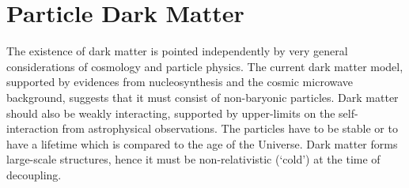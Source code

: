 \chapter{Particle Dark Matter}
\label{chParticleDarkMatter}

The existence of dark matter is pointed independently by very general considerations of cosmology and particle physics. 
The current dark matter model, supported by evidences from nucleosynthesis and the cosmic microwave background, suggests that it must consist of non-baryonic particles. 
Dark matter should also be weakly interacting, supported by upper-limits on the self-interaction from astrophysical observations. 
The particles have to be stable or to have a lifetime which is compared to the age of the Universe. Dark matter forms large-scale structures, hence it must be non-relativistic (`cold') at the time of decoupling.

